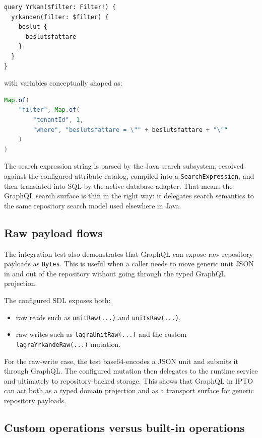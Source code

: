 \begin{lstlisting}[style=GraphQL]
query Yrkan($filter: Filter!) {
  yrkanden(filter: $filter) {
    beslut {
      beslutsfattare
    }
  }
}
\end{lstlisting}

with variables conceptually shaped as:

\begin{lstlisting}[language=Java,
    framesep=8pt,
    xleftmargin=5pt,
    framexleftmargin=5pt,
    frame=tb,
    framerule=0pt]
Map.of(
    "filter", Map.of(
        "tenantId", 1,
        "where", "beslutsfattare = \"" + beslutsfattare + "\""
    )
)
\end{lstlisting}

The search expression string is parsed by the Java search subsystem, resolved against the configured attribute catalog, compiled into a \texttt{SearchExpression}, and then translated into SQL by the active database adapter. That means the GraphQL search surface is thin in the right way: it delegates search semantics to the same repository search model used elsewhere in Java.

\subsection{Raw payload flows}

The integration test also demonstrates that GraphQL can expose raw repository payloads as \texttt{Bytes}. This is useful when a caller needs to move generic unit JSON in and out of the repository without going through the typed GraphQL projection.

The configured SDL exposes both:
\begin{itemize}
\item raw reads such as \texttt{unitRaw(...)} and \texttt{unitsRaw(...)},
\item raw writes such as \texttt{lagraUnitRaw(...)} and the custom \texttt{lagraYrkandeRaw(...)} mutation.
\end{itemize}

For the raw-write case, the test base64-encodes a JSON unit and submits it through GraphQL. The configured mutation then delegates to the runtime service and ultimately to repository-backed storage. This shows that GraphQL in IPTO can act both as a typed domain projection and as a transport surface for generic repository payloads.

\subsection{Custom operations versus built-in operations}

